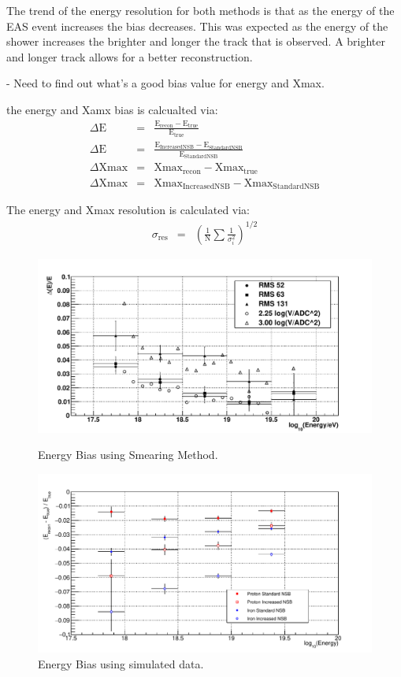 The trend of the energy resolution for both methods is that as the energy of the EAS event increases the bias decreases. This was expected as the energy of the shower increases the brighter and longer the track that is observed. A brighter and longer track allows for a better reconstruction.

- Need to find out what's a good bias value for energy and Xmax.

the energy and Xamx bias is calcualted via:
\begin{eqnarray}
\Delta \mathrm{E} &=& \frac{\mathrm{E}_{\mathrm{recon}} - \mathrm{E}_{\mathrm{true}}}{\mathrm{E}_{\mathrm{true}}} \\ 
\Delta \mathrm{E} &=& \frac{\mathrm{E}_{\mathrm{IncreasedNSB}} - \mathrm{E}_{\mathrm{StandardNSB}}}{\mathrm{E}_{\mathrm{StandardNSB}}} \\
\Delta \mathrm{Xmax} &=& \mathrm{Xmax}_{\mathrm{recon}} - \mathrm{Xmax}_{\mathrm{true}} \\
\Delta \mathrm{Xmax} &=& \mathrm{Xmax}_{\mathrm{IncreasedNSB}} - \mathrm{Xmax}_{\mathrm{StandardNSB}}
\end{eqnarray}

The energy and Xmax resolution is calculated via:
\begin{eqnarray}
\sigma_{\mathrm{res}} &=& \left( \frac{1}{\mathrm{N}} \sum \frac{1}{\sigma^2_i} \right)^{1/2}
\end{eqnarray}


\begin{figure}
\centering
\includegraphics[width=\textwidth]{chapters/graphs/SelectionEff/Smearing_RealData_EnergyBias.pdf}
\caption{Energy Bias using Smearing Method.}
\vspace{3mm}
\includegraphics[width=\textwidth]{chapters/graphs/SelectionEff/Simulation_ProtonIron_EnergyBias.pdf}
\caption{Energy Bias using simulated data.}
\end{figure}

